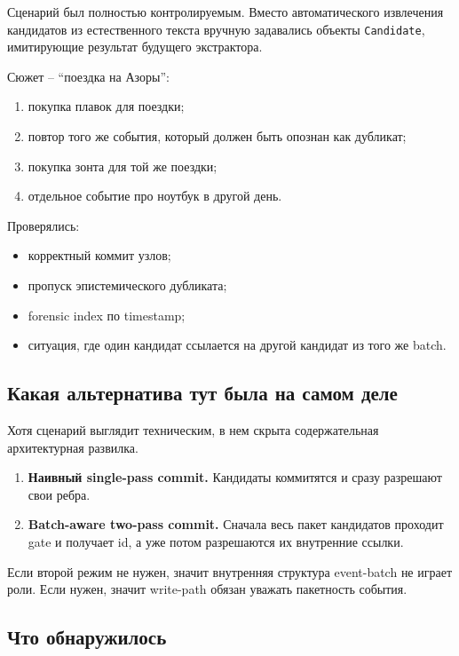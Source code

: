 Сценарий был полностью контролируемым. Вместо автоматического извлечения
кандидатов из естественного текста вручную задавались объекты \texttt{Candidate},
имитирующие результат будущего экстрактора.

Сюжет -- ``поездка на Азоры'':

\begin{enumerate}[leftmargin=2em]
\item покупка плавок для поездки;
\item повтор того же события, который должен быть опознан как дубликат;
\item покупка зонта для той же поездки;
\item отдельное событие про ноутбук в другой день.
\end{enumerate}

Проверялись:

\begin{itemize}[leftmargin=2em]
\item корректный коммит узлов;
\item пропуск эпистемического дубликата;
\item forensic index по timestamp;
\item ситуация, где один кандидат ссылается на другой кандидат из того же batch.
\end{itemize}

\subsection{Какая альтернатива тут была на самом деле}

Хотя сценарий выглядит техническим, в нем скрыта содержательная архитектурная
развилка.

\begin{enumerate}[leftmargin=2em]
\item \textbf{Наивный single-pass commit.} Кандидаты коммитятся и сразу
разрешают свои ребра.
\item \textbf{Batch-aware two-pass commit.} Сначала весь пакет кандидатов
проходит gate и получает id, а уже потом разрешаются их внутренние ссылки.
\end{enumerate}

Если второй режим не нужен, значит внутренняя структура event-batch не играет
роли. Если нужен, значит write-path обязан уважать пакетность события.

\subsection{Что обнаружилось}

